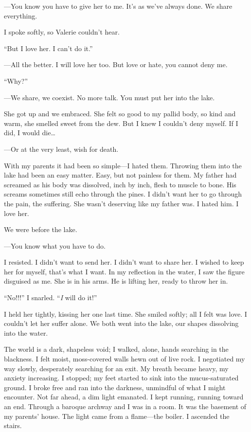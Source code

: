 \documentclass[
]{article}
\begin{document}
---You know you have to give her to me. It's as we've always done. We
share everything.

I spoke softly, so Valerie couldn't hear.

``But I love her. I can't do it.''

---All the better. I will love her too. But love or hate, you cannot
deny me.

``Why?''

---We share, we coexist. No more talk. You must put her into the lake.

She got up and we embraced. She felt so good to my pallid body, so kind
and warm, she smelled sweet from the dew. But I knew I couldn't deny
myself. If I did, I would die\ldots{}

---Or at the very least, wish for death.

With my parents it had been so simple---I hated them. Throwing them into
the lake had been an easy matter. Easy, but not painless for them. My
father had screamed as his body was dissolved, inch by inch, flesh to
muscle to bone. His screams sometimes still echo through the pines. I
didn't want her to go through the pain, the suffering. She wasn't
deserving like my father was. I hated him. I love her.

We were before the lake.

---You know what you have to do.

I resisted. I didn't want to send her. I didn't want to share her. I
wished to keep her for myself, that's what I want. In my reflection in
the water, I saw the figure disguised as me. She is in his arms. He is
lifting her, ready to throw her in.

``No!!!'' I snarled. ``\emph{I} will do it!''

I held her tightly, kissing her one last time. She smiled softly; all I
felt was love. I couldn't let her suffer alone. We both went into the
lake, our shapes dissolving into the water.

The world is a dark, shapeless void; I walked, alone, hands searching in
the blackness. I felt moist, moss-covered walls hewn out of live rock. I
negotiated my way slowly, desperately searching for an exit. My breath
became heavy, my anxiety increasing. I stopped; my feet started to sink
into the mucus-saturated ground. I broke free and ran into the darkness,
unmindful of what I might encounter. Not far ahead, a dim light
emanated. I kept running, running toward an end. Through a baroque
archway and I was in a room. It was the basement of my parents' house.
The light came from a flame---the boiler. I ascended the stairs.
\end{document}

